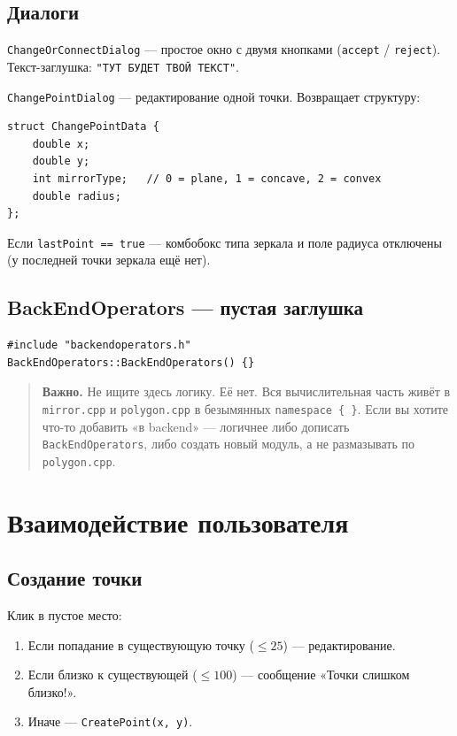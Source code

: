 \documentclass[a4paper,11pt]{article}
\newcommand{\file}[1]{\texttt{#1}}
\newcommand{\code}[1]{\texttt{#1}}
\begin{document}
\subsection{Диалоги}

\code{ChangeOrConnectDialog} — простое окно с двумя кнопками
(\code{accept} / \code{reject}). Текст-заглушка:
\code{"ТУТ БУДЕТ ТВОЙ ТЕКСТ"}.

\code{ChangePointDialog} — редактирование одной точки. Возвращает
структуру:

\begin{lstlisting}
struct ChangePointData {
    double x;
    double y;
    int mirrorType;   // 0 = plane, 1 = concave, 2 = convex
    double radius;
};
\end{lstlisting}

Если \code{lastPoint == true} — комбобокс типа зеркала и поле радиуса
отключены (у последней точки зеркала ещё нет).

\subsection{BackEndOperators — пустая заглушка}

\begin{lstlisting}[caption={Весь файл backendoperators.cpp}]
#include "backendoperators.h"
BackEndOperators::BackEndOperators() {}
\end{lstlisting}

\begin{quote}
\textbf{Важно.} Не ищите здесь логику. Её нет. Вся вычислительная
часть живёт в \file{mirror.cpp} и \file{polygon.cpp} в безымянных
\code{namespace \{ \}}. Если вы хотите что-то добавить «в backend» —
логичнее либо дописать \code{BackEndOperators}, либо создать новый
модуль, а не размазывать по \file{polygon.cpp}.
\end{quote}

\section{Взаимодействие пользователя}

\subsection{Создание точки}

Клик в пустое место:
\begin{enumerate}[leftmargin=*]
    \item Если попадание в существующую точку ($\le 25$) — редактирование.
    \item Если близко к существующей ($\le 100$) — сообщение «Точки слишком близко!».
    \item Иначе — \code{CreatePoint(x, y)}.
\end{enumerate}
\end{document}
